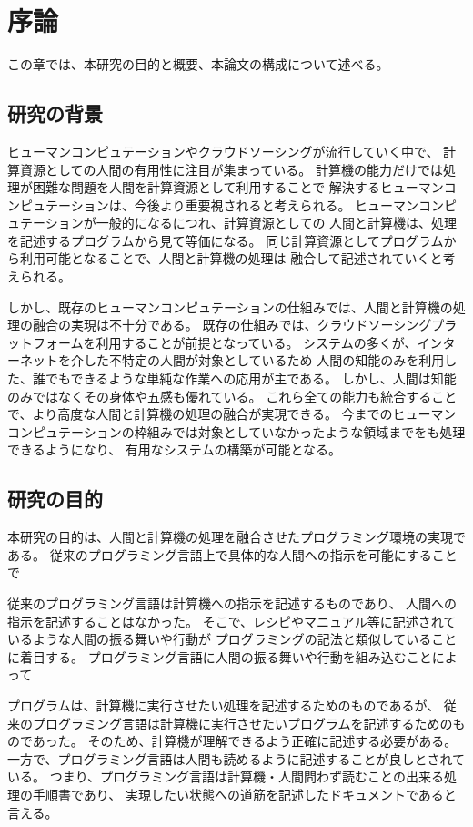 \chapter{序論}\label{chap:introduction}

この章では、本研究の目的と概要、本論文の構成について述べる。

\section{研究の背景}\label{ux7814ux7a76ux306eux80ccux666f}

ヒューマンコンピュテーションやクラウドソーシングが流行していく中で、
計算資源としての人間の有用性に注目が集まっている。
計算機の能力だけでは処理が困難な問題を人間を計算資源として利用することで
解決するヒューマンコンピュテーションは、今後より重要視されると考えられる。
ヒューマンコンピュテーションが一般的になるにつれ、計算資源としての
人間と計算機は、処理を記述するプログラムから見て等価になる。
同じ計算資源としてプログラムから利用可能となることで、人間と計算機の処理は
融合して記述されていくと考えられる。

しかし、既存のヒューマンコンピュテーションの仕組みでは、人間と計算機の処理の融合の実現は不十分である。
既存の仕組みでは、クラウドソーシングプラットフォームを利用することが前提となっている。
システムの多くが、インターネットを介した不特定の人間が対象としているため
人間の知能のみを利用した、誰でもできるような単純な作業への応用が主である。
しかし、人間は知能のみではなくその身体や五感も優れている。
これら全ての能力も統合することで、より高度な人間と計算機の処理の融合が実現できる。
今までのヒューマンコンピュテーションの枠組みでは対象としていなかったような領域までをも処理できるようになり、
有用なシステムの構築が可能となる。

\section{研究の目的}\label{ux7814ux7a76ux306eux76eeux7684}

本研究の目的は、人間と計算機の処理を融合させたプログラミング環境の実現である。
従来のプログラミング言語上で具体的な人間への指示を可能にすることで

従来のプログラミング言語は計算機への指示を記述するものであり、
人間への指示を記述することはなかった。
そこで、レシピやマニュアル等に記述されているような人間の振る舞いや行動が
プログラミングの記法と類似していることに着目する。
プログラミング言語に人間の振る舞いや行動を組み込むことによって

プログラムは、計算機に実行させたい処理を記述するためのものであるが、
従来のプログラミング言語は計算機に実行させたいプログラムを記述するためのものであった。
そのため、計算機が理解できるよう正確に記述する必要がある。
一方で、プログラミング言語は人間も読めるように記述することが良しとされている。
つまり、プログラミング言語は計算機・人間問わず読むことの出来る処理の手順書であり、
実現したい状態への道筋を記述したドキュメントであると言える。

